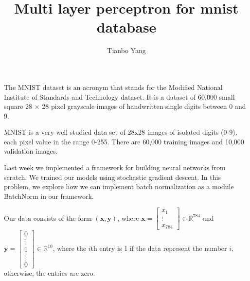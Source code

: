 \documentclass[11pt]{amsart}
\begin{document}
\title{Multi layer perceptron for mnist database}
\author{Tianbo Yang}
\maketitle

The MNIST dataset is an acronym that stands for the Modified National Institute of Standards and Technology dataset. It is a dataset of 60,000 small square 28 $\times$ 28 pixel grayscale images of handwritten single digits between 0 and 9.

MNIST is a very well-studied data set of 28x28 images of isolated digits (0-9), each pixel value in the range 0-255. There are 60,000 training images and 10,000 validation images.

Last week we implemented a framework for building neural networks from scratch. We trained our models using stochastic gradient descent. In this problem, we explore how we can implement batch normalization as a module BatchNorm in our framework.

Our data consists of the form $\left(\mathbf{x}, \mathbf{y}\right)$, where $\mathbf{x}=\left[\begin{array}{c}x_1\\\vdots\\x_{784}\end{array}\right]\in \mathbb{R}^{784}$ and $\mathbf{y}=\left[\begin{array}{c}0\\\vdots\\1\\\vdots\\0\end{array}\right]\in \mathbb{R}^{10}$, where the $i$th entry is 1 if the data represent the number $i$, otherwise, the entries are zero.
\end{document}
